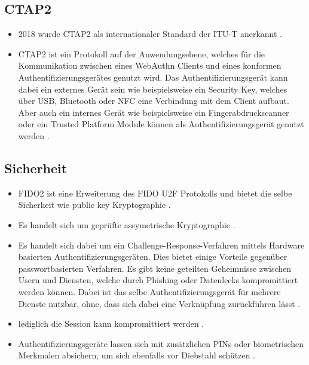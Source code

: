 \subsection{CTAP2}
\begin{itemize}
    \item 2018 wurde \ac{CTAP2} als internationaler Standard der \ac{ITU-T} anerkannt \cite{barbosa2021provable}.
    \item \ac{CTAP2} ist ein Protokoll auf der Anwendungsebene, welches für die Kommunikation zwischen eines WebAuthn Clients und eines konformen Authentifizierungsgerätes genutzt wird. Das Authentifizierungsgerät kann dabei ein externes Gerät sein wie beispielsweise ein Security Key, welches über USB, Bluetooth oder NFC eine Verbindung mit dem Client aufbaut. Aber auch ein internes Gerät wie beispielsweise ein Fingerabdruckscanner oder ein Trusted Platform Module können als Authentifizierungsgerät genutzt werden \cite{lyastani2020fido2}.
\end{itemize}

\subsection{Sicherheit}

\begin{itemize}
    \item FIDO2 ist eine Erweiterung des FIDO U2F Protokolls und bietet die selbe Sicherheit wie public key Kryptographie \cite{lyastani2020fido2}.
    \item Es handelt sich um geprüfte assymetrische Kryptographie \cite{farke2020you}.
    \item Es handelt sich dabei um ein Challenge-Response-Verfahren mittels Hardware basierten Authentifizierungsgeräten. Dies bietet einige Vorteile gegenüber passwortbasierten Verfahren. Es gibt keine geteilten Geheimnisse zwischen Usern und Diensten, welche durch Phishing oder Datenlecks kompromittiert werden können. Dabei ist das selbe Authentifizierungsgerät für mehrere Dienste nutzbar, ohne, dass sich dabei eine Verknüpfung zurückführen lässt \cite{lyastani2020fido2} \cite{farke2020you}.
    \item lediglich die Session kann kompromittiert werden \cite{morii2017research}.
    \item Authentifizierungsgeräte lassen sich mit zusätzlichen PINs oder biometrischen Merkmalen absichern, um sich ebenfalls vor Diebstahl schützen \cite{barbosa2021provable}.
\end{itemize}

